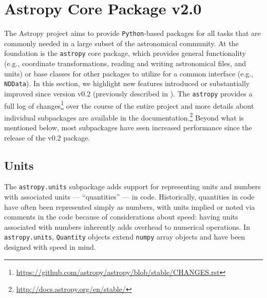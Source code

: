 \documentclass[modern]{aastex61}
\newcommand{\package}[1]{\texttt{#1}\xspace}
\newcommand{\python}{\package{Python}}
\newcommand{\astropy}{Astropy\xspace}
\newcommand{\astropypkg}{\package{astropy}}
\newcommand{\inlinecomment}[2]{\todo[inline]{#1: #2}\xspace}
\begin{document}
\section{Astropy Core Package v2.0}
\label{sec:core}
The \astropy project aims to provide \python-based packages for all tasks that
are commonly needed in a large subset of the astronomical community.
At the foundation is the \astropypkg core package, which provides general
functionality (e.g., coordinate transformations, reading and writing
astronomical files, and units) or base classes for other
packages to utilize for a common interface (e.g., \texttt{NDData}).
In this section, we highlight new features introduced or substantially improved
since version v0.2 (previously described in \citealt{astropy}).  The \astropypkg
provides a full log of changes\footnote{\url{https://github.com/astropy/astropy/blob/stable/CHANGES.rst}}
over the course of the entire project and more details about individual
subpackages are available in the documentation.\footnote{\url{http://docs.astropy.org/en/stable/}}
Beyond what is mentioned below, most subpackages have seen increased performance
since the release of the v0.2 package.



\subsection{Units}\label{sec:units}

The \texttt{astropy.units} subpackage adds support for representing units and
numbers with associated units --- ``quantities'' --- in code.
Historically, quantities in code have often been represented simply as numbers,
with units implied or noted via comments in the code because of considerations
about speed: having units associated with numbers inherently adds overhead to
numerical operations.
In \texttt{astropy.units}, \texttt{Quantity} objects extend \texttt{numpy}
array objects and have been designed with speed in mind.
\end{document}
